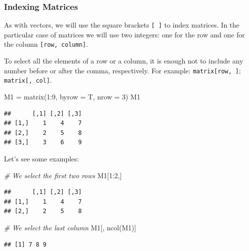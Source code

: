 \documentclass[
]{book}
\newenvironment{Shaded}{\begin{snugshade}}{\end{snugshade}}
\newcommand{\AttributeTok}[1]{\textcolor[rgb]{0.77,0.63,0.00}{#1}}
\newcommand{\CommentTok}[1]{\textcolor[rgb]{0.56,0.35,0.01}{\textit{#1}}}
\newcommand{\DecValTok}[1]{\textcolor[rgb]{0.00,0.00,0.81}{#1}}
\newcommand{\FunctionTok}[1]{\textcolor[rgb]{0.00,0.00,0.00}{#1}}
\newcommand{\NormalTok}[1]{#1}
\newcommand{\OtherTok}[1]{\textcolor[rgb]{0.56,0.35,0.01}{#1}}
\newcommand{\SpecialCharTok}[1]{\textcolor[rgb]{0.00,0.00,0.00}{#1}}
\begin{document}
\hypertarget{indexing-matrices}{%
\subsubsection{Indexing Matrices}\label{indexing-matrices}}

As with vectors, we will use the square brackets \texttt{{[}\ {]}} to index matrices. In the particular case of matrices we will use two integers: one for the row and one for the column \texttt{{[}row,\ column{]}}.

To select all the elements of a row or a column, it is enough not to include any number before or after the comma, respectively. For example: \texttt{matrix{[}row,\ {]}}; \texttt{matrix{[},\ col{]}}.

\begin{Shaded}
\begin{Highlighting}[]
\NormalTok{M1 }\OtherTok{=} \FunctionTok{matrix}\NormalTok{(}\DecValTok{1}\SpecialCharTok{:}\DecValTok{9}\NormalTok{, }\AttributeTok{byrow =}\NormalTok{ T, }\AttributeTok{nrow =} \DecValTok{3}\NormalTok{)}
\NormalTok{M1}
\end{Highlighting}
\end{Shaded}

\begin{verbatim}
##      [,1] [,2] [,3]
## [1,]    1    4    7
## [2,]    2    5    8
## [3,]    3    6    9
\end{verbatim}

Let's see some examples:

\begin{Shaded}
\begin{Highlighting}[]
\CommentTok{\# We select the first two rows}
\NormalTok{M1[}\DecValTok{1}\SpecialCharTok{:}\DecValTok{2}\NormalTok{,]}
\end{Highlighting}
\end{Shaded}

\begin{verbatim}
##      [,1] [,2] [,3]
## [1,]    1    4    7
## [2,]    2    5    8
\end{verbatim}

\begin{Shaded}
\begin{Highlighting}[]
\CommentTok{\# We select the last column}
\NormalTok{M1[, }\FunctionTok{ncol}\NormalTok{(M1)]}
\end{Highlighting}
\end{Shaded}

\begin{verbatim}
## [1] 7 8 9
\end{verbatim}
\end{document}
